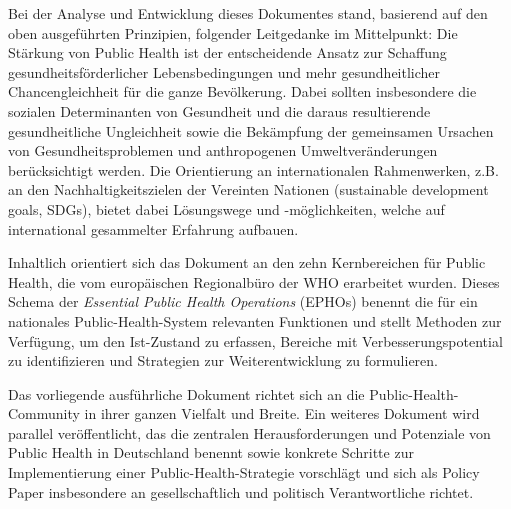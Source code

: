 \documentclass{article}
\begin{document}
Bei der Analyse und Entwicklung dieses Dokumentes stand, basierend auf den oben ausgeführten Prinzipien, folgender Leitgedanke im Mittelpunkt: Die Stärkung von Public Health ist der entscheidende Ansatz zur Schaffung gesundheitsförderlicher Lebensbedingungen und mehr gesundheitlicher Chancengleichheit für die ganze Bevölkerung. Dabei sollten insbesondere die sozialen Determinanten von Gesundheit und die daraus resultierende gesundheitliche Ungleichheit sowie die Bekämpfung der gemeinsamen Ursachen von Gesundheitsproblemen und anthropogenen Umweltveränderungen berücksichtigt werden. Die Orientierung an internationalen Rahmenwerken, z.B. an den Nachhaltigkeitszielen der Vereinten Nationen (sustainable development goals, SDGs), bietet dabei Lösungswege und -möglichkeiten, welche auf international gesammelter Erfahrung aufbauen.


Inhaltlich orientiert sich das Dokument an den zehn Kernbereichen für Public Health, die vom europäischen Regionalbüro der WHO erarbeitet wurden. Dieses Schema der \emph{Essential Public Health Operations} (EPHOs) benennt die für ein nationales Public-Health-System relevanten Funktionen und stellt Methoden zur Verfügung, um den Ist-Zustand zu erfassen, Bereiche mit Verbesserungspotential zu identifizieren und Strategien zur Weiterentwicklung zu formulieren.


Das vorliegende ausführliche Dokument richtet sich an die Public-Health-Community in ihrer ganzen Vielfalt und Breite. Ein weiteres Dokument wird parallel veröffentlicht, das die zentralen Herausforderungen und Potenziale von Public Health in Deutschland benennt sowie konkrete Schritte zur Implementierung einer Public-Health-Strategie vorschlägt und sich als Policy Paper insbesondere an gesellschaftlich und politisch Verantwortliche richtet.
\end{document}
